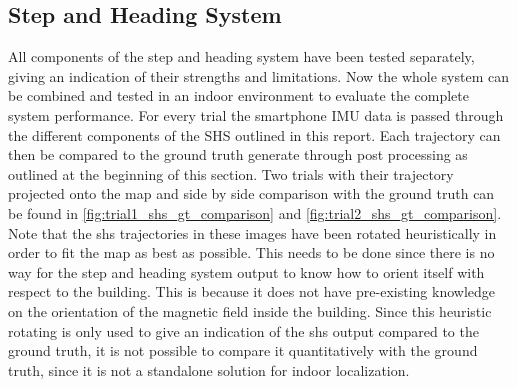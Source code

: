 \subsection{Step and Heading System}
All components of the step and heading system have been tested separately, giving an indication of their strengths and limitations. Now the whole system can be combined and tested in an indoor environment to evaluate the complete system performance.
For every trial the smartphone IMU data is passed through the different components of the SHS outlined in this report. Each trajectory can then be compared to the ground truth generate through post processing as outlined at the beginning of this section. Two trials with their trajectory projected onto the map and side by side comparison with the ground truth can be found in \cref{fig:trial1_shs_gt_comparison} and \cref{fig:trial2_shs_gt_comparison}. Note that the shs trajectories in these images have been rotated heuristically in order to fit the map as best as possible. This needs to be done since there is no way for the step and heading system output to know how to orient itself with respect to the building. This is because it does not have pre-existing knowledge on the orientation of the magnetic field inside the building. Since this heuristic rotating is only used to give an indication of the shs output compared to the ground truth, it is not possible to compare it quantitatively with the ground truth, since it is not a standalone solution for indoor localization.

